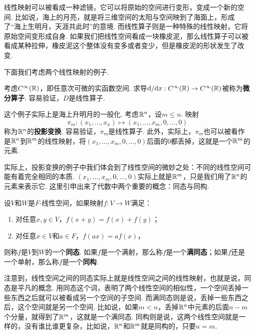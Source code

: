 线性映射可以被看成一种滤镜，它可以将原始的空间进行变形，变成一个新的空间. 比如说，海上的月亮，就是将三维空间的太阳与空间映到了海面上，形成了“海上生明月，天涯共此时”的意境. 而线性算子则是一种特殊的线性映射，它将原始空间变形成自身. 如果我们把线性空间看成一块橡皮泥，那么线性算子可以被看成某种拉伸，橡皮泥这个整体没有变多或者变少，但是橡皮泥的形状发生了改变. 

下面我们考虑两个线性映射的例子. 

\begin{example}[微分算子]
考虑$C^\infty(\mathbb{R})$，即任意次可微的实函数空间. 求导$\mathrm{d}/\mathrm{d} x:C^\infty(\mathbb{R})\to C^\infty(\mathbb{R})$被称为\textbf{微分算子}. 容易验证，$D$是线性算子. 
\end{example}

\begin{example}[投影变换]
这个例子实际上是海上升明月的一般化. 考虑$\mathbb{R}^n$，设$m\leq n$. 映射
\[\pi_m:(x_1,\dots,x_n)\mapsto (x_1,\dots,x_m,0,\dots,0)\]
称为$\mathbb{R}^n$的\textbf{投影变换}. 容易验证，$\pi_m$是线性算子. 此外，实际上，$\pi_m$也可以被看作是$\mathbb{R}^n$到$\mathbb{R}^m$的线性映射，将$(x_1,\dots,x_m,0,\dots,0)$后面的$0$都丢掉，这就是一个$\mathbb{R}^m$的元素. 
\end{example}

实际上，投影变换的例子中我们体会到了线性空间的微妙之处：不同的线性空间可能有着完全相同的本质. $(x_1,\dots,x_m,0,\dots,0)$实际上就是$\mathbb{R}^m$，只是我们用了$\mathbb{R}^n$的元素来表示它. 这里引申出来了代数中两个重要的概念：同态与同构. 

\begin{definition}[同态与同构]
设$V$和$W$是$F$-线性空间，如果映射$f:V\to W$满足：
\begin{enumerate}
    \item 对任意$x,y\in V$，$f(x+y)=f(x)+f(y)$；
    \item 对任意$x\in V$和$a\in F$，$f(ax)=af(x)$，
\end{enumerate}
则称$f$是$V$到$W$的一个\textbf{同态}. 如果$f$是一个满射，那么称$f$是一个\textbf{满同态}；如果$f$还是一个单射，那么称$f$是一个\textbf{同构}. 
\end{definition}

注意到，线性空间之间的同态实际上就是线性空间之间的线性映射，也就是说，同态是平凡的概念. 用同态这个词，表明了两个线性空间的相似性，一个空间丢掉一些东西之后就可以被看成另一个空间的子空间. 而满同态则是说，丢掉一些东西之后，这个空间就是另一个空间. 比如说，如果$m<n$，丢掉$\mathbb{R}^n$中元素的后面$n-m$个分量，就得到了$\mathbb{R}^m$，这就是一个满同态. 同构则是说，这两个线性空间就是一样的，没有谁比谁更复杂，比如说，$\mathbb{R}^n$和$\mathbb{R}^m$就是同构的，只要$n=m$. 

